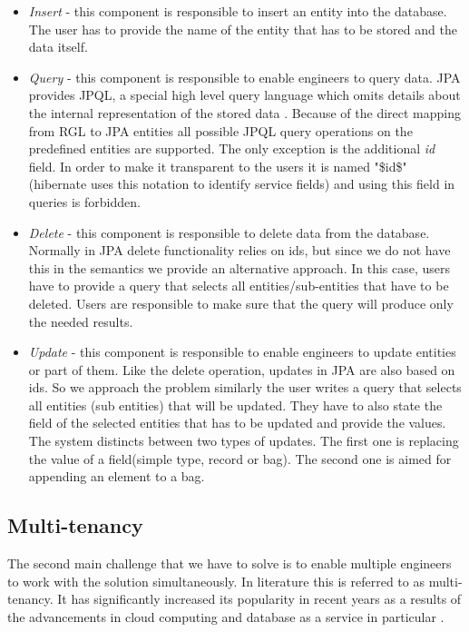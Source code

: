\begin{itemize}
	\item \textit{Insert} - this component is responsible to insert an entity into the database. The user has to provide the name of the entity that has to be stored and the data itself.
	
	\item \textit{Query} - this component is responsible to enable engineers to query data. JPA provides JPQL, a special high level query language which omits details about the internal representation of the stored data \cite{JPQL}. Because of the direct mapping from RGL to JPA entities all possible JPQL query operations on the predefined entities are supported. The only exception is the additional \textit{id} field. In order to make it transparent to the users it is named "\$id\$"(hibernate uses this notation to identify service fields) and using this field in queries is forbidden.
	
	\item \textit{Delete} - this component is responsible to delete data from the database. Normally in JPA delete functionality relies on ids, but since we do not have this in the semantics we provide an alternative approach. In this case, users have to provide a query that selects all entities/sub-entities that have to be deleted. Users are responsible to make sure that the query will produce only the needed results.
	
	\item \textit{Update} - this component is responsible to enable engineers to update entities or part of them. Like the delete operation, updates in JPA are also based on ids. So we approach the problem similarly the user writes a query that selects all entities (sub entities) that will be updated. They have to also state the field of the selected entities that has to be updated and provide the values. The system distincts between two types of updates. The first one is replacing the value of a field(simple type, record or bag). The second one is aimed for appending an element to a bag.
\end{itemize}

\subsection{Multi-tenancy}
The second main challenge that we have to solve is to enable multiple engineers to work with the solution simultaneously. In literature this is referred to as multi-tenancy. It has significantly increased its popularity in recent years as a results of the advancements in cloud computing and database as a service in particular \cite{Hui}. 

